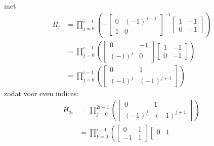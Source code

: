 \documentclass[a4paper,12pt]{article}
\begin{document}
\begin{example}
    met
    \begin{align*}
        H_i & = \prod_{j=0}^{i-1}{\left(-\left[
            \begin{array}{cc}
                0 & (-1)^{j+1} \\
                1 & 0
            \end{array}
            \right]^{-1}\left[
            \begin{array}{cc}
                1 & -1 \\
                0 & -1
            \end{array}
        \right] \right)}                        \\
            & =
        \prod_{j=0}^{i-1}{\left(\left[
            \begin{array}{cc}
                0        & -1 \\
                (-1)^{j} & 0
            \end{array}
            \right]\left[
            \begin{array}{cc}
                1 & -1 \\
                0 & -1
            \end{array}
        \right] \right)}                        \\
            & =
        \prod_{j=0}^{i-1}{\left(\left[
            \begin{array}{cc}
                0        & 1          \\
                (-1)^{j} & (-1)^{j+1}
            \end{array}
            \right] \right)}
    \end{align*}
    zodat voor even indices:
    \begin{align*}
        H_{2i} & = \prod_{j=0}^{2i-1}{\left(\left[
            \begin{array}{cc}
                0        & 1          \\
                (-1)^{j} & (-1)^{j+1}
            \end{array}
        \right] \right)}                           \\
               & =
        \prod_{k=0}^{i-1}{\left(\left[
            \begin{array}{cc}
                0  & 1 \\
                -1 & 1
            \end{array}
            \right]\left[
            \begin{array}{cc}
                0 & 1  \\

\end{array}}
\end{align*}
\end{example}
\end{document}
